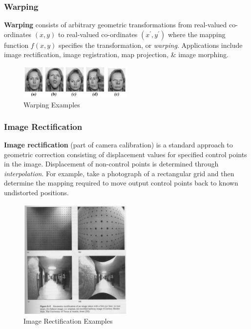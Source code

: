 \documentclass[a4paper,11pt]{article}
\begin{document}
\subsubsection{Warping}
\textbf{Warping} consists of arbitrary geometric transformations from real-valued co-ordinates $(x,y)$ to real-valued co-ordinates $(x^\prime, y^\prime)$ where the mapping function $f(x,y)$ specifies the transformation, or \textit{warping}.
Applications include image rectification, image registration, map projection, \& image morphing.

\begin{figure}[H]
    \centering
    \includegraphics[width=0.5\textwidth]{images/warping_examples.png}
    \caption{Warping Examples}
\end{figure}

\subsubsection{Image Rectification}
\textbf{Image rectification} (part of camera calibration) is a standard approach to geometric correction consisting of displacement values for specified control points in the image.
Displacement of non-control points is determined through \textit{interpolation}.
For example, take a photograph of a rectangular grid and then determine the mapping required to move output control points back to known undistorted positions.

\begin{figure}[H]
    \centering
    \includegraphics[width=0.5\textwidth]{images/rectification_examples.png}
    \caption{Image Rectification Examples}
\end{figure}
\end{document}
